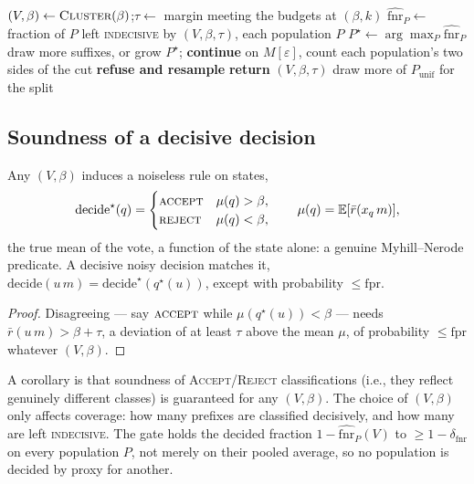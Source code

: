 \begin{algorithm}
\caption{$\textsc{SampleFamily}$: the resampling loop and its gates}
\label{alg:gate}
\begin{algorithmic}[1]
\Loop
  \State $(V,\beta)\gets\textsc{Cluster}(\beta)$;\quad $\tau\gets$ margin meeting the budgets at $(\beta,k)$
  \State $\widehat{\mathrm{fnr}}_P\gets$ fraction of $P$ left \textsc{indecisive} by $(V,\beta,\tau)$, each population $P$
  \State $P^\star\gets\arg\max_P\widehat{\mathrm{fnr}}_P$
     \State draw more suffixes, or grow $P^\star$; \textbf{continue}
  \EndIf
  \State on $M[\varepsilon]$, count each population's two sides of the cut
   \textbf{ refuse and resample} 
   \State \textbf{return} $(V,\beta,\tau)$ 
  \Else{} draw more of $P_{\mathrm{unif}}$ for the split 
  \EndIf
\EndLoop
\end{algorithmic}
\end{algorithm}

\subsection{Soundness of a decisive decision}

\begin{lemma}\label{lem:decisive}
Any $(V,\beta)$ induces a noiseless rule on states,
\[
  \mathrm{decide}^\star(q)=\begin{cases}\textsc{accept}&\mu(q)>\beta,\\ \textsc{reject}&\mu(q)<\beta,\end{cases}
  \qquad \mu(q)=\mathbb E[\bar r(x_q\,m)],
\]
the true mean of the vote, a function of the state alone: a genuine
Myhill--Nerode predicate. A decisive noisy decision matches it,
$\mathrm{decide}(u\,m)=\mathrm{decide}^\star(q^\star(u))$, except with probability
$\le\mathrm{fpr}$.
\end{lemma}
\begin{proof}
Disagreeing --- say $\textsc{accept}$ while $\mu(q^\star(u))<\beta$ --- needs
$\bar r(u\,m)>\beta+\tau$, a deviation of at least $\tau$ above the
mean $\mu$, of probability $\le\mathrm{fpr}$ whatever $(V,\beta)$.
\end{proof}

A corollary is that soundness of \textsc{Accept}/\textsc{Reject} classifications
(i.e., they reflect genuinely different classes) is guaranteed for any $(V,\beta)$.
The choice of $(V,\beta)$ only affects coverage: how many prefixes are classified
decisively, and how many are left \textsc{indecisive}. The gate holds the decided
fraction $1-\widehat{\mathrm{fnr}}_P(V)$ to $\ge1-\delta_{\mathrm{fnr}}$ on every
population $P$, not merely on their pooled average, so no population is decided by proxy
for another.

